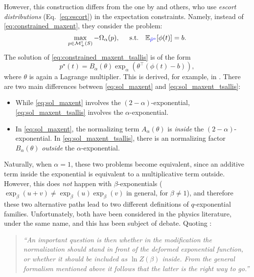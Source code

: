 \documentclass{article}
\begin{document}
However, this construction differs from the one by \citet{Tsallis1988} and others, who use {\it escort distributions} (Eq.~\ref{eq:escort}) in the expectation constraints. Namely, instead of \eqref{eq:constrained_maxent}, they consider the problem:
\begin{equation}\label{eq:constrained_maxent_tsallis}
\max_{p \in \mathcal{M}_+^1(S)}  -\Omega_\alpha(p), \hspace{0.5cm} \mathrm{s.t.}  \hspace{0.35cm} \mathbb{E}_{\textcolor{blue}{\tilde{p}^{\alpha}}}[\phi(t)] = b.
\end{equation}
The solution of \eqref{eq:constrained_maxent_tsallis} is of the form
\begin{equation}\label{eq:sol_maxent_tsallis}
    p^\star(t) = B_{\alpha}(\theta)\exp_{\alpha}(\theta^\top (\phi(t) - b)),
\end{equation}
where $\theta$ is again a Lagrange multiplier. This is derived, for example, in \citep[Eq.~15]{abe2003geometry}. 
There are two main differences between \eqref{eq:sol_maxent} and \eqref{eq:sol_maxent_tsallis}:
\begin{itemize}
    \item While \eqref{eq:sol_maxent} involves the $(2-\alpha)$-exponential, \eqref{eq:sol_maxent_tsallis} involves the $\alpha$-exponential.
    \item In \eqref{eq:sol_maxent}, the normalizing term $A_\alpha(\theta)$ is {\it inside} the $(2-\alpha)$-exponential. In \eqref{eq:sol_maxent_tsallis}, there is an normalizing factor $B_{\alpha}(\theta)$ {\it outside} the $\alpha$-exponential. 
\end{itemize}
Naturally, when $\alpha=1$, these two problems become equivalent, since an additive term inside the exponential is equivalent to a multiplicative term outside. However, this does {\it not} happen with $\beta$-exponentials ($\exp_\beta(u+v) \ne \exp_\beta(u) \exp_\beta(v)$ in general, for $\beta \ne 1$), and therefore these two alternative paths lead to two different definitions of $q$-exponential families. Unfortunately, both have been considered in the physics literature, under the same name, and  
this has been subject of debate. Quoting \citet[\S 1]{naudts2009q}: 

\begin{quote}
{\it ``An important question is then whether in the modification the normalization should stand in front of the deformed exponential function, or whether it should be included as $\ln Z(\beta)$ inside. From the general formalism mentioned above it follows
that the latter is the right way to go.''}
\end{quote}
\end{document}
